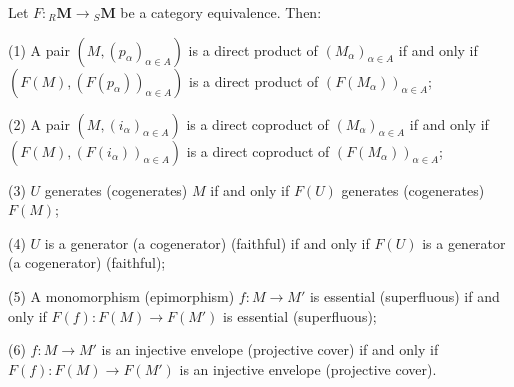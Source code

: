 Let $F: {}_R \mathbf{M} \to {}_S \mathbf{M}$ be a category equivalence. Then:

(1) A pair $(M, (p_\alpha)_{\alpha \in A})$ is a direct product of $(M_\alpha)_{\alpha \in A}$ if and only if $(F(M), (F(p_\alpha))_{\alpha \in A})$ is a direct product of $(F(M_\alpha))_{\alpha \in A}$;

(2) A pair $(M, (i_\alpha)_{\alpha \in A})$ is a direct coproduct of $(M_\alpha)_{\alpha \in A}$ if and only if $(F(M), (F(i_\alpha))_{\alpha \in A})$ is a direct coproduct of $(F(M_\alpha))_{\alpha \in A}$;

(3) $U$ generates (cogenerates) $M$ if and only if $F(U)$ generates (cogenerates) $F(M)$;

(4) $U$ is a generator (a cogenerator) (faithful) if and only if $F(U)$ is a generator (a cogenerator) (faithful);

(5) A monomorphism (epimorphism) $f: M \to M'$ is essential (superfluous) if and only if $F(f): F(M) \to F(M')$ is essential (superfluous);

(6) $f: M \to M'$ is an injective envelope (projective cover) if and only if $F(f): F(M) \to F(M')$ is an injective envelope (projective cover).
